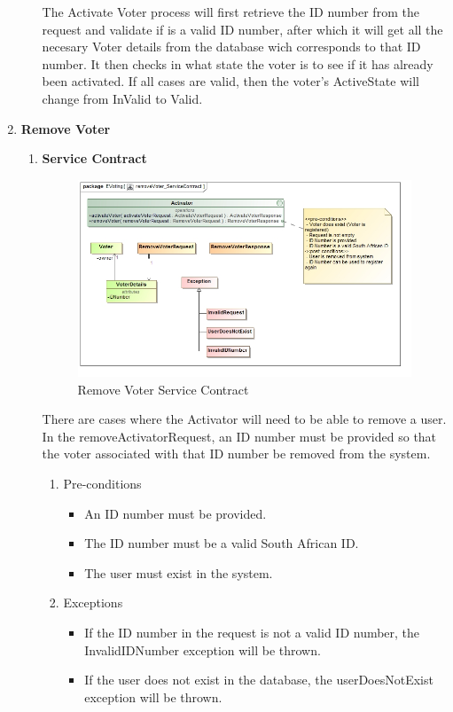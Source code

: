 \begin{enumerate}
\begin{enumerate}
				The Activate Voter process will first retrieve the ID number from the request and validate if is a valid ID number, after which it will get all the necesary Voter details from the database wich corresponds to that ID number. It then checks in what state the voter is to see if it has already been activated. If all cases are valid, then the voter's ActiveState will change from InValid to Valid.
				\newline
		\end{enumerate}
	
	\item \textbf{Remove Voter}
		\begin{enumerate}
			\item \textbf{Service Contract}
			\begin{figure}[H]
				\centering
				\includegraphics[width=0.75\linewidth]{../Images/Activator/ServiceContract/removeVoter_ServiceContract.jpg}
				\caption{Remove Voter Service Contract}
			\end{figure}
			
			There are cases where the Activator will need to be able to remove a user. In the removeActivatorRequest, an ID number must be provided so that the voter associated with that ID number be removed from the system.
			\newline
			
			\begin{enumerate}
				\item Pre-conditions
				\begin{itemize}
					\item An ID number must be provided.
					\item The ID number must be a valid South African ID.
					\item The user must exist in the system.
				\end{itemize}
				
				\item Exceptions
				\begin{itemize}
						\item If the ID number in the request is not a valid ID number, the InvalidIDNumber exception will be thrown.
						\item If the user does not exist in the database, the userDoesNotExist exception will be thrown.
				\end{itemize}
				

\end{enumerate}
\end{enumerate}
\end{enumerate}
